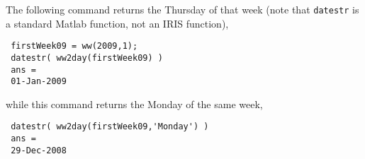  The following command returns the Thursday of that week (note that
 \texttt{datestr} is a standard Matlab function, not an IRIS function),
 
 \begin{verbatim}
 firstWeek09 = ww(2009,1);
 datestr( ww2day(firstWeek09) )
 ans =
 01-Jan-2009
 \end{verbatim}
 
 while this command returns the Monday of the same week,
 
 \begin{verbatim}
 datestr( ww2day(firstWeek09,'Monday') )
 ans =
 29-Dec-2008
 \end{verbatim}


